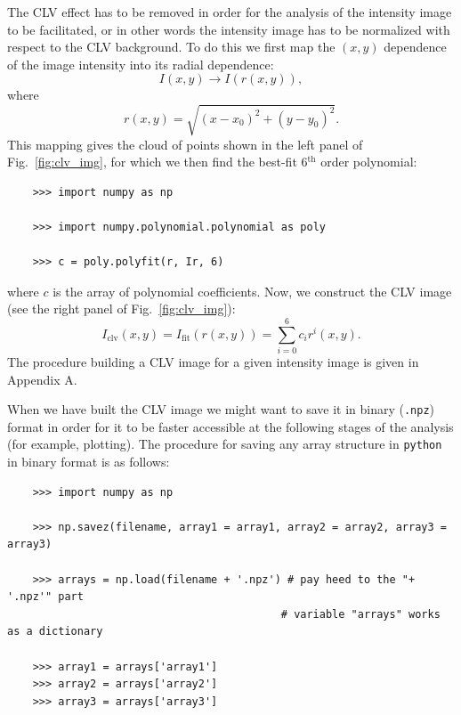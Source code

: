\documentclass[paper=a4, fontsize=11pt]{article}
\numberwithin{equation}{section}
\numberwithin{figure}{section}
\numberwithin{table}{section}
\begin{document}
The CLV effect has to be removed in order for the analysis of the intensity image to be facilitated,
or in other words the intensity image has to be normalized with respect to the CLV background.
To do this we first map the $(x, y)$ dependence of the image intensity into its radial dependence:
\begin{equation}
I(x, y) \rightarrow I(r(x, y)),
\end{equation}
where
\begin{equation}
r(x, y) = \sqrt{(x - x_0)^2 + (y - y_0)^2}.
\end{equation}
This mapping gives the cloud of points shown in the left panel of Fig.~\ref{fig:clv_img},
for which we then find the best-fit 6$^\mathrm{th}$ order polynomial:
\begin{verbatim}
    >>> import numpy as np

    >>> import numpy.polynomial.polynomial as poly

    >>> c = poly.polyfit(r, Ir, 6)
\end{verbatim}
where $c$ is the array of polynomial coefficients.
Now, we construct the CLV image (see the right panel of Fig.~\ref{fig:clv_img}):
\begin{equation}
I_\mathrm{clv}(x, y) = I_\mathrm{fit}(r(x, y)) = \sum\limits_{i = 0}^6c_ir^i(x, y).
\end{equation}
The procedure building a CLV image for a given intensity image is given in Appendix A.

When we have built the CLV image we might want to save it in binary (\texttt{.npz}) format in order for it
to be faster accessible at the following stages of the analysis (for example, plotting).
The procedure for saving any array structure in \texttt{python} in binary format is as follows:
\begin{verbatim}
    >>> import numpy as np

    >>> np.savez(filename, array1 = array1, array2 = array2, array3 = array3)
 
    >>> arrays = np.load(filename + '.npz') # pay heed to the "+ '.npz'" part
                                           # variable "arrays" works as a dictionary
 
    >>> array1 = arrays['array1']
    >>> array2 = arrays['array2']
    >>> array3 = arrays['array3']

\end{verbatim}
\end{document}
